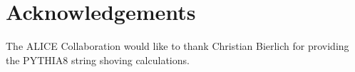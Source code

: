 \documentclass[ALICE,manyauthors]{cernphprep}
\begin{document}
\setcounter{page}{2}






\newenvironment{acknowledgement}{\relax}{\relax}
\begin{acknowledgement}
\section*{Acknowledgements}
\noindent The ALICE Collaboration would like to thank Christian Bierlich for providing the PYTHIA8 string shoving calculations.
\end{acknowledgement}

\newpage
\appendix



\clearpage




%     
\end{document}
